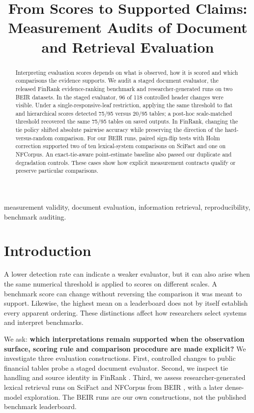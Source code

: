 \documentclass[conference]{IEEEtran}
\begin{document}
\title{From Scores to Supported Claims: Measurement Audits of Document and Retrieval Evaluation}
\author{}
\maketitle
\begin{abstract}
Interpreting evaluation scores depends on what is observed, how it is
scored and which comparisons the evidence supports. We audit a staged
document evaluator, the released FinRank evidence-ranking benchmark and
researcher-generated runs on two BEIR datasets. In the staged evaluator,
96 of 118 controlled header changes were visible. Under a
single-responsive-leaf restriction, applying the same threshold to flat
and hierarchical scores detected 75/95 versus 20/95 tables; a post-hoc
scale-matched threshold recovered the same 75/95 tables on saved
outputs. In FinRank, changing the tie policy shifted absolute pairwise
accuracy while preserving the direction of the hard-versus-random
comparison. For our BEIR runs, paired sign-flip tests with Holm
correction supported two of ten lexical-system comparisons on SciFact
and one on NFCorpus. An exact-tie-aware point-estimate baseline also
passed our duplicate and degradation controls. These cases show how
explicit measurement contracts qualify or preserve particular
comparisons.
\end{abstract}
\begin{IEEEkeywords}
measurement validity, document evaluation, information retrieval,
reproducibility, benchmark auditing.
\end{IEEEkeywords}
\section{Introduction}\label{introduction}

A lower detection rate can indicate a weaker evaluator, but it can also
arise when the same numerical threshold is applied to scores on
different scales. A benchmark score can change without reversing the
comparison it was meant to support. Likewise, the highest mean on a
leaderboard does not by itself establish every apparent ordering. These
distinctions affect how researchers select systems and interpret
benchmarks.

We ask: \textbf{which interpretations remain supported when the
observation surface, scoring rule and comparison procedure are made
explicit?} We investigate three evaluation constructions. First,
controlled changes to public financial tables probe a staged document
evaluator. Second, we inspect tie handling and source identity in
FinRank \cite{r1}. Third, we assess researcher-generated lexical
retrieval runs on SciFact and NFCorpus from BEIR \cite{r2}, with a later
dense-model exploration. The BEIR runs are our own constructions, not
the published benchmark leaderboard.
\end{document}

